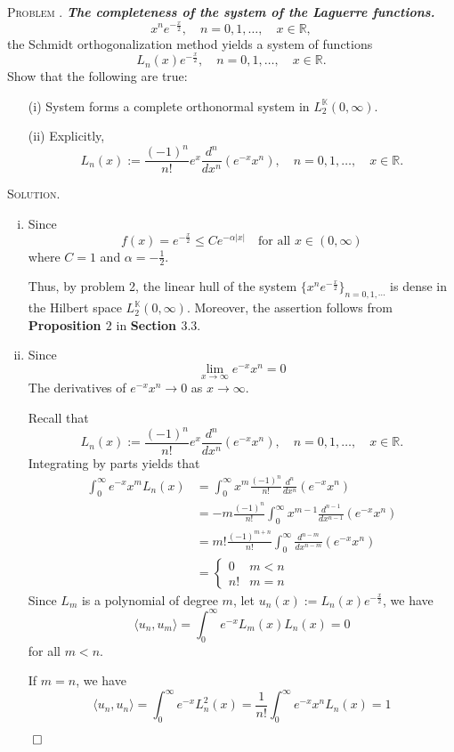 \documentclass[12pt, a4paper, oneside]{ctexart}
\newcounter{problemname}
\newenvironment{problem}{\begin{framed}\stepcounter{problemname}\par\noindent\textsc{Problem \arabic{problemname}. }}{\end{framed}\par}
\newenvironment{solution}{%
	\par\noindent\textsc{Solution. }\ignorespaces
}{%
	\hfill$\qed$\par
}
\begin{document}
	\begin{problem}
		\textit{\textbf{The completeness of the system of the Laguerre functions.}}
		\[
		x^n e^{-\frac{x}{2}}, \quad n = 0, 1, \dots, \quad x \in \mathbb{R},
		\]
		the Schmidt orthogonalization method yields a system of functions
		\[
		L_n(x) e^{-\frac{x}{2}}, \quad n = 0, 1, \dots, \quad x \in \mathbb{R}.
		\]
		Show that the following are true:
		\begin{enumerate}
			\item[(i)] System forms a complete orthonormal system in $L_2^\mathbb{K}(0, \infty)$.
			\item[(ii)] Explicitly,
			\[
			L_n(x) := \frac{(-1)^n}{n!} e^{x} \frac{d^n}{dx^n} \left(e^{-x} x^n\right), \quad n = 0, 1, \dots, \quad x \in \mathbb{R}.
			\]
		\end{enumerate}
	\end{problem}
	
	\begin{solution}
		\begin{enumerate}[(i)]
			\item Since \[ f(x) = e^{-\frac{x}{2}}\leq C e^{-\alpha|x|}\quad\text{for all }x\in (0,\infty) \]where $C = 1$ and $\alpha = -\frac{1}{2}$.
			
			Thus, by problem 2, the linear hull of the system $\{x^{n}e^{-\frac{x}{2}}\}_{n=0,1,\cdots}$ is dense in the Hilbert space $L_{2}^{\mathbb{K}}(0,\infty)$. Moreover, the assertion follows from \textbf{Proposition $2$} in \textbf{Section $3.3$}.
			\item Since\[ \lim\limits_{x\to\infty}e^{-x}x^{n} = 0 \] The derivatives of $e^{-x}x^{n} \to 0$ as $x\to\infty$.
			
			Recall that \[ 	L_n(x) := \frac{(-1)^n}{n!} e^{x} \frac{d^n}{dx^n} \left(e^{-x} x^n\right), \quad n = 0, 1, \dots, \quad x \in \mathbb{R}. \]  Integrating by parts yields that \[ \begin{aligned}
				\int_{0}^{\infty}e^{-x}x^{m}L_{n}(x) &= \int_{0}^{\infty}x^{m}\frac{(-1)^n}{n!}\frac{d^n}{dx^n} \left(e^{-x} x^n\right)\\&=-m\frac{(-1)^n}{n!}\int_{0}^{\infty}x^{m-1}\frac{d^{n-1}}{dx^{n-1}}\left(e^{-x} x^n\right)\\&=m!\frac{(-1)^{m+n}}{n!}\int_{0}^{\infty}\frac{d^{n-m}}{dx^{n-m}}\left(e^{-x} x^n\right)\\&=\begin{cases}
					0 & m<n\\
					n! & m =n
				\end{cases}
			\end{aligned} \] 
			Since $L_{m}$ is a polynomial of degree $m$, let $u_{n}(x) := L_{n}(x) e^{-\frac{x}{2}}$, we have \[ \langle u_{n}, u_{m}\rangle = \int_{0}^{\infty}e^{-x}L_{m}(x)L_{n}(x) = 0 \]for all $m<n$.
			
			If $m=n$, we have\[ \langle u_{n},u_{n}\rangle = \int_{0}^{\infty}e^{-x}L_{n}^{2}(x) = \dfrac{1}{n!}\int_{0}^{\infty}e^{-x}x^{n}L_{n}(x) =1\]
		\end{enumerate}
		
	\end{solution}
	
\end{document}
